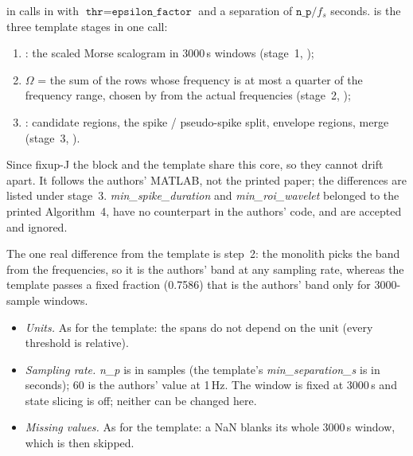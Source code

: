  in  calls  in
 with $\texttt{thr} = \texttt{epsilon\_factor}$
and a separation of $\texttt{n\_p}/f_s$ seconds.  is the three template
stages in one call:
\begin{enumerate}
\item {}: the scaled Morse scalogram in 3000\,s windows (stage~1,
  );
\item $\Omega$ = the sum of the rows whose frequency is at most a quarter of the frequency
  range, chosen by  from the actual frequencies (stage~2,
  );
\item {}: candidate regions, the spike / pseudo-spike split, envelope
  regions, merge (stage~3, ).
\end{enumerate}
Since fixup-J the block and the template share this core, so they cannot drift apart. It
follows the authors' MATLAB, not the printed paper; the differences are listed under
stage~3. \emph{min\_spike\_duration} and \emph{min\_roi\_wavelet} belonged to the printed
Algorithm~4, have no counterpart in the authors' code, and are accepted and ignored.

The one real difference from the template is step~2: the monolith picks the band from the
frequencies, so it is the authors' band at any sampling rate, whereas the template passes a
fixed fraction (0.7586) that is the authors' band only for 3000-sample windows.

\begin{itemize}
\item \emph{Units.} As for the template: the spans do not depend on the unit (every threshold
  is relative).
\item \emph{Sampling rate.} \emph{n\_p} is in samples (the template's
  \emph{min\_separation\_s} is in seconds); 60 is the authors' value at 1\,Hz. The window is
  fixed at 3000\,s and state slicing is off; neither can be changed here.
\item \emph{Missing values.} As for the template: a NaN blanks its whole 3000\,s window, which
  is then skipped.
\end{itemize}


